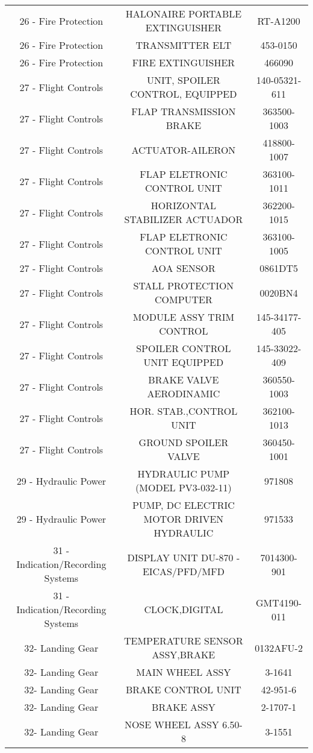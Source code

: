 \begin{table}[H]
\begin{tabular}{ccc}
    26 - Fire Protection & HALONAIRE PORTABLE EXTINGUISHER & RT-A1200 \\
    26 - Fire Protection & TRANSMITTER ELT & 453-0150 \\
    26 - Fire Protection & FIRE EXTINGUISHER & 466090 \\
    27 - Flight Controls & UNIT, SPOILER CONTROL, EQUIPPED  & 140-05321-611 \\
    27 - Flight Controls & FLAP TRANSMISSION BRAKE  & 363500-1003 \\
    27 - Flight Controls & ACTUATOR-AILERON  & 418800-1007 \\
    27 - Flight Controls & FLAP ELETRONIC CONTROL UNIT  & 363100-1011 \\
    27 - Flight Controls & HORIZONTAL STABILIZER ACTUADOR  & 362200-1015 \\
    27 - Flight Controls & FLAP ELETRONIC CONTROL UNIT  & 363100-1005 \\
    27 - Flight Controls & AOA SENSOR  & 0861DT5 \\
    27 - Flight Controls & STALL PROTECTION COMPUTER  & 0020BN4 \\
    27 - Flight Controls & MODULE ASSY TRIM CONTROL  & 145-34177-405 \\
    27 - Flight Controls & SPOILER CONTROL UNIT EQUIPPED  & 145-33022-409 \\
    27 - Flight Controls & BRAKE VALVE AERODINAMIC  & 360550-1003 \\
    27 - Flight Controls & HOR. STAB.,CONTROL UNIT  & 362100-1013 \\
    27 - Flight Controls & GROUND SPOILER VALVE  & 360450-1001 \\
    29 - Hydraulic Power & HYDRAULIC PUMP (MODEL PV3-032-11)  & 971808 \\
    29 - Hydraulic Power & PUMP, DC ELECTRIC MOTOR DRIVEN HYDRAULIC  & 971533 \\
    31 - Indication/Recording Systems & DISPLAY UNIT DU-870 - EICAS/PFD/MFD & 7014300-901 \\
    31 - Indication/Recording Systems & CLOCK,DIGITAL & GMT4190-011 \\
    32- Landing Gear & TEMPERATURE SENSOR ASSY,BRAKE  & 0132AFU-2 \\
    32- Landing Gear & MAIN WHEEL ASSY  & 3-1641 \\
    32- Landing Gear & BRAKE CONTROL UNIT  & 42-951-6 \\
    32- Landing Gear & BRAKE ASSY  & 2-1707-1 \\
    32- Landing Gear & NOSE WHEEL ASSY 6.50-8  & 3-1551 \\

\end{tabular}
\end{table}
